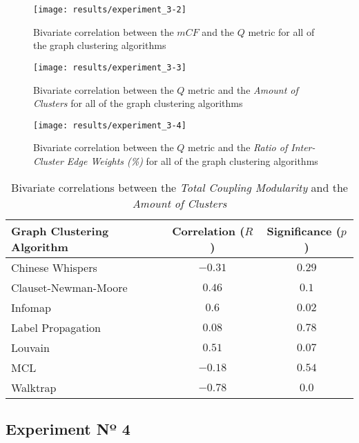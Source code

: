 \documentclass[12pt,a4paper]{report}
\begin{document}
\begin{figure}[htbp]
\centering
\texttt{[image: results/experiment\_3-2]}
\caption{Bivariate correlation between the $mCF$ and the $Q$ metric for all of the graph clustering algorithms}
\label{fig:experiment-3.2}
\end{figure}

\begin{figure}[htbp]
\centering
\texttt{[image: results/experiment\_3-3]}
\caption{Bivariate correlation between the $Q$ metric and the \textit{Amount of Clusters} for all of the graph clustering algorithms}
\label{fig:experiment-3.3}
\end{figure}

\begin{figure}[htbp]
\centering
\texttt{[image: results/experiment\_3-4]}
\caption{Bivariate correlation between the $Q$ metric and the \textit{Ratio of Inter-Cluster Edge Weights (\%)} for all of the graph clustering algorithms}
\label{fig:experiment-3.4}
\end{figure}

\begin{table}[ht!]
\def\arraystretch{1.55}
\begin{tabularx}{\textwidth}{|X|c|c|}
\hline
Graph Clustering Algorithm & Correlation ($R$) & Significance ($p$) \\
\hline\hline

Chinese Whispers      & $-0.31$ & $0.29$  \\\hline
Clauset-Newman-Moore  & $0.46$  & $0.1$   \\\hline
Infomap               & $0.6$   & $0.02$  \\\hline
Label Propagation     & $0.08$  & $0.78$  \\\hline
Louvain               & $0.51$  & $0.07$  \\\hline
MCL                   & $-0.18$ & $0.54$  \\\hline
Walktrap              & $-0.78$ & $0.0$   \\\hline

\end{tabularx}
\caption{Bivariate correlations between the \textit{Total Coupling Modularity} and the \textit{Amount of Clusters}}
\label{table:experiment-3.5}
\end{table}


\subsection{Experiment Nº 4}
\end{document}
